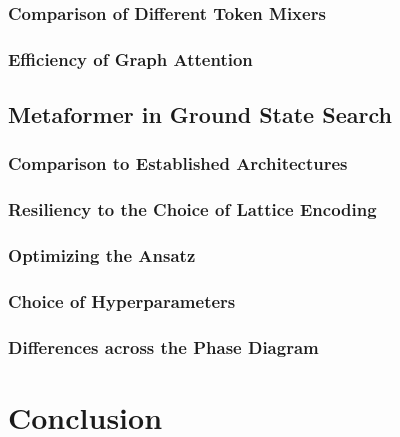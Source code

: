 \documentclass[
headings=optiontohead,              %
12pt,                               %
DIV=13,                             %
twoside=true,                       %
open=any,                         %
BCOR=10mm,                          %
toc=bibliographynumbered            %
]{scrreport}
\begin{document}
        \subsection{Comparison of Different Token Mixers}
        \label{sec:experiments-tokenmixers}
        
        \FloatBarrier
        \subsection{Efficiency of Graph Attention}
        \label{sec:experiments-efficiency-graphs}
        
        \FloatBarrier

    \section{Metaformer in Ground State Search}
    \label{sec:experiments-ground-state-search}
    
        \subsection{Comparison to Established Architectures}
        \label{sec:experiments-comparisontoestablished}
        
        \FloatBarrier
        \subsection{Resiliency to the Choice of Lattice Encoding}
        \label{sec:experiments-resiliencylatticeencoding}
        
        \FloatBarrier
        \subsection{Optimizing the Ansatz}
        \label{sec:experiments-optimizingtheansatz}
        
        \FloatBarrier
        \subsection{Choice of Hyperparameters}
        \label{sec:experiments-hyperparameters}
        
        \FloatBarrier
        \subsection{Differences across the Phase Diagram}
        \label{sec:experiments-phasecriticalpoint}
        
        \FloatBarrier

\chapter{Conclusion}
\label{sec:conclusion}

\FloatBarrier



\end{document}
